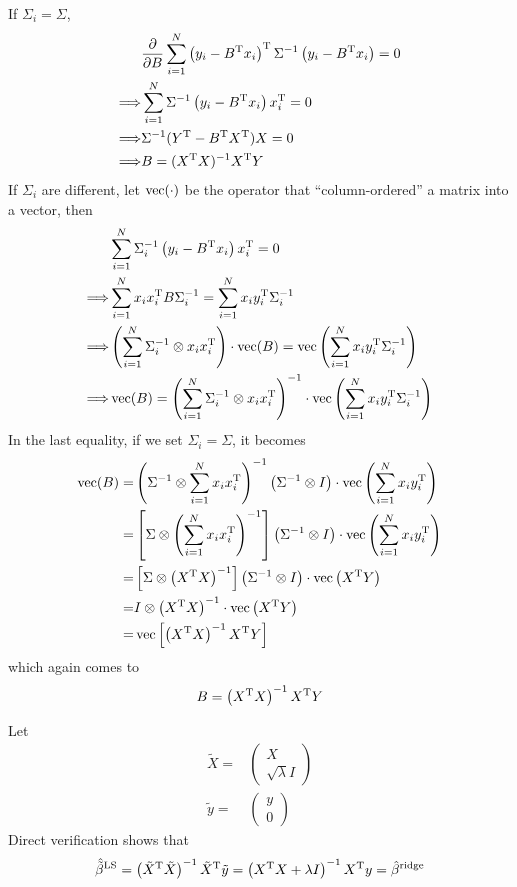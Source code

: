 \begin{sol}
If $\Sigma_i=\Sigma$,
\begin{align*}
& \frac{\partial}{\partial B}\sum_{i=1}^N\left(y_i-B^{\mathrm{T}}x_i\right)^{\mathrm{T}}\Sigma^{-1}\left(y_i-B^{\mathrm{T}}x_i\right)=0\\
\Longrightarrow & \sum_{i=1}^N\Sigma^{-1}\left(y_i-B^{\mathrm{T}}x_i\right)x_i^{\mathrm{T}}=0\\
\Longrightarrow & \Sigma^{-1}(Y^{\mathrm{T}}-B^{\mathrm{T}}X^{\mathrm{T}})X=0\\
\Longrightarrow & B=(X^{\mathrm{T}}X)^{-1}X^{\mathrm{T}}Y
\end{align*}
If $\Sigma_i$ are different, let $\operatorname{vec}(\cdot)$ be the operator that ``column-ordered'' a matrix into a vector, then
\begin{align*}
& \sum_{i=1}^N\Sigma_i^{-1}\left(y_i-B^{\mathrm{T}}x_i\right)x_i^{\mathrm{T}}=0\\
\Longrightarrow & \sum_{i=1}^{N}x_ix_i^{\mathrm{T}}B\Sigma_i^{-1}=\sum_{i=1}^{N}x_iy_i^{\mathrm{T}}\Sigma_i^{-1} \\
\Longrightarrow & \left(\sum_{i=1}^{N}\Sigma_i^{-1}\otimes x_ix_i^{\mathrm{T}}\right)\cdot\operatorname{vec}(B)=\operatorname{vec}\left(\sum_{i=1}^{N}x_iy_i^{\mathrm{T}}\Sigma_i^{-1}\right)\\
\Longrightarrow & \operatorname{vec}(B)=\left(\sum_{i=1}^{N}\Sigma_i^{-1}\otimes x_ix_i^{\mathrm{T}}\right)^{-1}\cdot\operatorname{vec}\left(\sum_{i=1}^{N}x_iy_i^{\mathrm{T}}\Sigma_i^{-1}\right)
\end{align*}
In the last equality, if we set $\Sigma_i=\Sigma$, it becomes
\begin{align*}
\operatorname{vec}(B) =& \left(\Sigma^{-1}\otimes\sum_{i=1}^{N}x_ix_i^{\mathrm{T}}\right)^{-1} \left(\Sigma^{-1}\otimes I\right)\cdot\operatorname{vec}\left(\sum_{i=1}^{N}x_iy_i^{\mathrm{T}}\right)\\
=& \left[\Sigma\otimes\left(\sum_{i=1}^{N}x_ix_i^{\mathrm{T}}\right)^{-1}\right] \left(\Sigma^{-1}\otimes I\right)\cdot\operatorname{vec}\left(\sum_{i=1}^{N}x_iy_i^{\mathrm{T}}\right)\\
=& \left[\Sigma\otimes\left(X^{\mathrm{T}}X\right)^{-1}\right] \left(\Sigma^{-1}\otimes I\right)\cdot\operatorname{vec}\left(X^{\mathrm{T}}Y\right)\\
=& I\otimes \left(X^{\mathrm{T}}X\right)^{-1}\cdot \operatorname{vec}\left(X^{\mathrm{T}}Y\right)\\
=& \operatorname{vec}\left[\left(X^{\mathrm{T}}X\right)^{-1}X^{\mathrm{T}}Y\right]
\end{align*}
which again comes to
\[
B=\left(X^{\mathrm{T}}X\right)^{-1}X^{\mathrm{T}}Y
\]
\end{sol}

\begin{sol}
Let
\begin{align*}
\tilde{X}=&\begin{pmatrix}
X\\
\sqrt{\lambda}I
\end{pmatrix}\\
\tilde{y}=&\begin{pmatrix}
y\\
0
\end{pmatrix}
\end{align*}
Direct verification shows that
\[
\hat{\tilde{\beta}}^{\mathrm{LS}}=\left(\tilde{X}^{\mathrm{T}}\tilde{X}\right)^{-1}\tilde{X}^{\mathrm{T}}\tilde{y}=\left(X^{\mathrm{T}}X+\lambda I\right)^{-1}X^{\mathrm{T}}y=\hat{\beta}^{\mathrm{ridge}}
\]
\end{sol}

